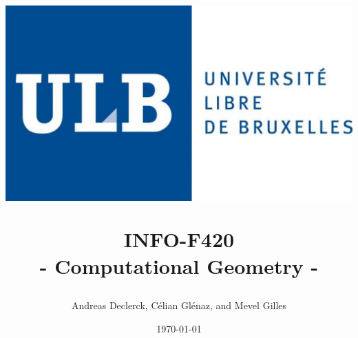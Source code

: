 \title{
    \includegraphics[scale=0.2]{static/ULB.jpg}\\
    \vspace{8mm}

    \textbf{INFO-F420}\\
    \textbf{- Computational Geometry -}\\
}
\author{
    Andreas Declerck, Célian Glénaz, and Mevel Gilles\\
    \vspace{10mm}
}
\date{\today}

\maketitle

\thispagestyle{empty}
\newpage